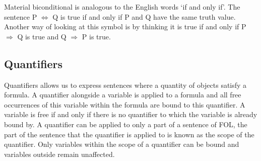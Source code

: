 Material biconditional is analogous to the English words `if and only if'. The sentence P $\Leftrightarrow$ Q is true if and only if P and Q have the same truth value. Another way of looking at this symbol is by thinking it is true if and only if P $\Rightarrow$ Q is true and Q $\Rightarrow $ P is true.

\subsection*{Quantifiers}

Quantifiers allows us to express sentences where a quantity of objects satisfy a formula. A quantifier alongside a variable is applied to a formula and all free occurrences of this variable within the formula are bound to this quantifier. A variable is free if and only if there is no quantifier to which the variable is already bound by. A quantifier can be applied to only a part of a sentence of FOL, the part of the sentence that the quantifier is applied to is known as the scope of the quantifier. Only variables within the scope of a quantifier can be bound and variables outside remain unaffected.

